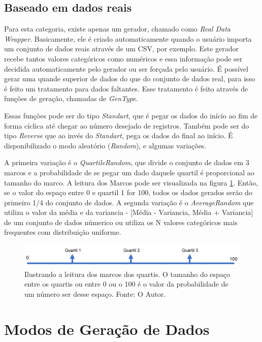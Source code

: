 \documentclass[
	12pt,				%
	openright,			%
	twoside,			%
	a4paper,			%
	english,			%
	brazil				%
	]{abntex2}
\begin{document}
		\subsection{Baseado em dados reais}
		Para esta categoria, existe apenas um gerador, chamado como \emph{Real Data Wrapper}.
		Basicamente, ele é criado automaticamente quando o usuário importa um conjunto de dados reais através de um CSV, por exemplo.
		Este gerador recebe tantos valores categóricos como numéricos e essa informação pode ser decidida automaticamente pelo gerador ou ser forçada pelo usuário.
		É possível gerar uma quande superior de dados do que do conjunto de dados real, para isso é feito um tratamento para dados faltantes.
		Esse tratamento é feito através de funções de geração, chamadas de \emph{GenType}.
		\par
		Essas funções pode ser do tipo \emph{Standart}, que é pegar os dados do início ao fim de forma cíclica até chegar ao número desejado de registros.
		Também pode ser do tipo \emph{Reverse} que ao invés do \emph{Standart}, pega os dados do final ao início.
		É disponibilizado o modo aleatório (\emph{Random}), e algumas variações.
		\par
		A primeira variação é o \emph{QuartileRandom}, que divide o conjunto de dados em 3 marcos e a probabilidade de se pegar um dado daquele quartil é proporcional ao tamanho do marco.
		A leitura dos Marcos pode ser visualizada na figura \ref{fig:leituraMarco}. Então, se o valor do espaço entre 0 e quartil 1 for 100, todos os dados gerados serão do primeiro 1/4 do conjunto de dados.
		A segunda variação é o \emph{AverageRandom} que utiliza o valor da média e da variancia - [Média - Variancia, Média + Variancia] de um conjunto de dados númerico ou utiliza os N valores categóricos mais frequentes com distribuição uniforme.
		\begin{figure}[h]
			\centering
			\includegraphics[width=\linewidth]{./figures/prototipo/quartil.png}
			\caption{Ilustrando a leitura dos marcos dos quartis. O tamanho do espaço entre os quartis ou entre 0 ou o 100 é o valor da probabilidade de um número ser desse espaço. Fonte: O Autor.}
			\label{fig:leituraMarco}
		\end{figure}
	\section{Modos de Geração de Dados}
\end{document}
